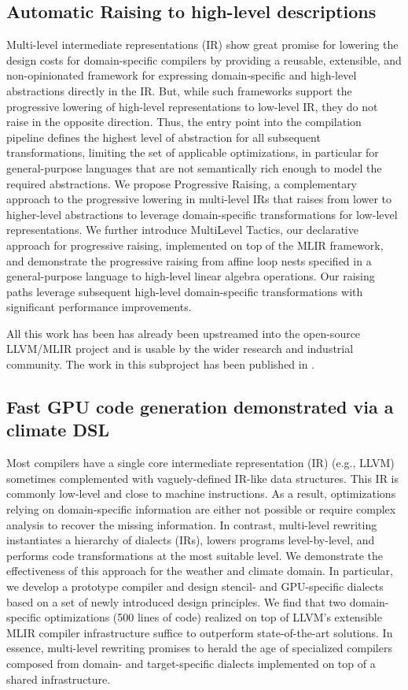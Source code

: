 \documentclass[11pt, manuscript,\review anonymous]{acmart}
\begin{document}
\subsection{Automatic Raising to high-level descriptions}

Multi-level intermediate representations (IR) show great promise for lowering
the design costs for domain-specific compilers by providing a reusable,
extensible, and non-opinionated framework for expressing domain-specific and
high-level abstractions directly in the IR. But, while such frameworks support
the progressive lowering of high-level representations to low-level IR, they do
not raise in the opposite direction. Thus, the entry point into the compilation
pipeline defines the highest level of abstraction for all subsequent
transformations, limiting the set of applicable optimizations, in particular
for general-purpose languages that are not semantically rich enough to model
the required abstractions.  We propose Progressive Raising, a complementary
approach to the progressive lowering in multi-level IRs that raises from lower
to higher-level abstractions to leverage domain-specific transformations for
low-level representations. We further introduce MultiLevel Tactics, our
declarative approach for progressive raising, implemented on top of the MLIR
framework, and demonstrate the progressive raising from affine loop nests
specified in a general-purpose language to high-level linear algebra
operations.  Our raising paths leverage subsequent high-level domain-specific
transformations with significant performance improvements.

All this work has been has already been upstreamed into the open-source
LLVM/MLIR project and is usable by the wider research and industrial community.
The work in this subproject has been published in \citet{chelini2021mlir}.

\subsection{Fast GPU code generation demonstrated via a climate DSL}

Most compilers have a single core intermediate representation (IR) (e.g., LLVM)
sometimes complemented with vaguely-defined IR-like data structures. This IR is
commonly low-level and close to machine instructions. As a result,
optimizations relying on domain-specific information are either not possible or
require complex analysis to recover the missing information. In contrast,
multi-level rewriting instantiates a hierarchy of dialects (IRs), lowers
programs level-by-level, and performs code transformations at the most suitable
level. We demonstrate the effectiveness of this approach for the weather and
climate domain. In particular, we develop a prototype compiler and design
stencil- and GPU-specific dialects based on a set of newly introduced design
principles. We find that two domain-specific optimizations (500 lines of code)
realized on top of LLVM’s extensible MLIR compiler infrastructure suffice to
outperform state-of-the-art solutions. In essence, multi-level rewriting
promises to herald the age of specialized compilers composed from domain- and
target-specific dialects implemented on top of a shared infrastructure.
\end{document}

